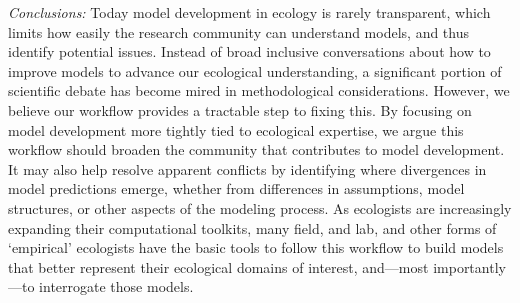 \documentclass[11pt]{article}
\begin{document}
\emph{Conclusions:} 
Today model development in ecology is rarely transparent, which limits how easily the research community can understand models, and thus identify potential issues. Instead of broad inclusive conversations about how to improve models to advance our ecological understanding, a significant portion of scientific debate has become mired in methodological considerations. However, we believe our workflow provides a tractable step to fixing this. By focusing on model development more tightly tied to ecological expertise, we argue this workflow should broaden the community that contributes to model development. It may also help resolve apparent conflicts by identifying where divergences in model predictions emerge, whether from differences in assumptions, model structures, or other aspects of the modeling process.
As ecologists are increasingly expanding their computational toolkits, many field, and lab, and other forms of `empirical' ecologists have the basic tools to follow this workflow to build models that better represent their ecological domains of interest, and---most importantly---to interrogate those models.


\clearpage

\end{document}
